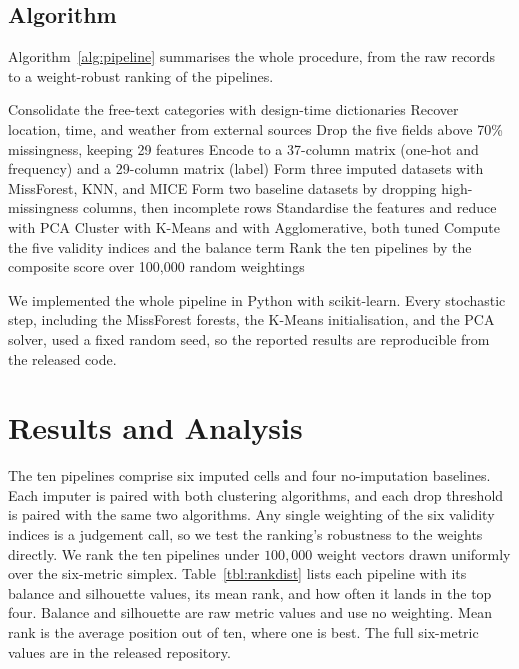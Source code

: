 \documentclass[conference]{IEEEtran}
\begin{document}
\subsection{Algorithm}
Algorithm~\ref{alg:pipeline} summarises the whole procedure, from the raw records to a weight-robust ranking of the pipelines.

\begin{algorithm}[H]
\caption{Imputation and clustering pipeline}
\label{alg:pipeline}
\begin{algorithmic}[1]
\State Consolidate the free-text categories with design-time dictionaries
\State Recover location, time, and weather from external sources
\State Drop the five fields above 70\% missingness, keeping 29 features
\State Encode to a 37-column matrix (one-hot and frequency) and a 29-column matrix (label)
\State Form three imputed datasets with MissForest, KNN, and MICE
\State Form two baseline datasets by dropping high-missingness columns, then incomplete rows
    \State Standardise the features and reduce with PCA
    \State Cluster with K-Means and with Agglomerative, both tuned
    \State Compute the five validity indices and the balance term
\EndFor
\State Rank the ten pipelines by the composite score over 100{,}000 random weightings
\end{algorithmic}
\end{algorithm}

We implemented the whole pipeline in Python with scikit-learn. Every stochastic step, including the MissForest forests, the K-Means initialisation, and the PCA solver, used a fixed random seed, so the reported results are reproducible from the released code.

\section{Results and Analysis}
\label{sec:analysis-results}

The ten pipelines comprise six imputed cells and four no-imputation baselines. Each imputer is paired with both clustering algorithms, and each drop threshold is paired with the same two algorithms. Any single weighting of the six validity indices is a judgement call, so we test the ranking's robustness to the weights directly. We rank the ten pipelines under $100{,}000$ weight vectors drawn uniformly over the six-metric simplex. Table~\ref{tbl:rankdist} lists each pipeline with its balance and silhouette values, its mean rank, and how often it lands in the top four. Balance and silhouette are raw metric values and use no weighting. Mean rank is the average position out of ten, where one is best. The full six-metric values are in the released repository.
\end{document}
